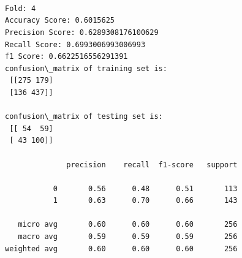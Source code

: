 \documentclass[11pt]{article}
\begin{document}
    \begin{center}
    \end{center}
    { \hspace*{\fill} \\}
    
    \begin{center}
    \end{center}
    { \hspace*{\fill} \\}
    
    \begin{Verbatim}[commandchars=\\\{\}]

Fold: 4
Accuracy Score: 0.6015625
Precision Score: 0.6289308176100629
Recall Score: 0.6993006993006993
f1 Score: 0.6622516556291391
confusion\_matrix of training set is: 
 [[275 179]
 [136 437]] 

confusion\_matrix of testing set is: 
 [[ 54  59]
 [ 43 100]] 

              precision    recall  f1-score   support

           0       0.56      0.48      0.51       113
           1       0.63      0.70      0.66       143

   micro avg       0.60      0.60      0.60       256
   macro avg       0.59      0.59      0.59       256
weighted avg       0.60      0.60      0.60       256


    \end{Verbatim}

    \begin{center}
    \end{center}
    { \hspace*{\fill} \\}
    
    \begin{center}
    \end{center}
    { \hspace*{\fill} \\}
    
\end{document}
